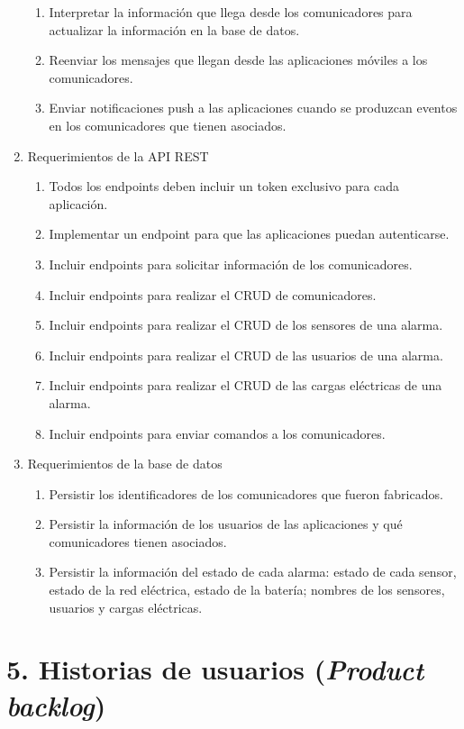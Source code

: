 \documentclass[
11pt, %
codirector, %
]{charter}
\begin{document}
\begin{enumerate}
\begin{enumerate}
			\item Interpretar la información que llega desde los comunicadores para actualizar la información en la base de datos.
			\item Reenviar los mensajes que llegan desde las aplicaciones móviles a los comunicadores.
			\item Enviar notificaciones push a las aplicaciones cuando se produzcan eventos en los comunicadores que tienen asociados.
		\end{enumerate}
	\item Requerimientos de la API REST
		\begin{enumerate}
			\item Todos los endpoints deben incluir un token exclusivo para cada aplicación.
			\item Implementar un endpoint para que las aplicaciones puedan autenticarse.
			\item Incluir endpoints para solicitar información de los comunicadores.
			\item Incluir endpoints para realizar el CRUD de comunicadores.
			\item Incluir endpoints para realizar el CRUD de los sensores de una alarma.
			\item Incluir endpoints para realizar el CRUD de las usuarios de una alarma.
			\item Incluir endpoints para realizar el CRUD de las cargas eléctricas de una alarma.
			\item Incluir endpoints para enviar comandos a los comunicadores.
		\end{enumerate}
	\item Requerimientos de la base de datos
		\begin{enumerate}
			\item Persistir los identificadores de los comunicadores que fueron fabricados.
			\item Persistir la información de los usuarios de las aplicaciones y qué comunicadores tienen asociados.
			\item Persistir la información del estado de cada alarma: estado de cada sensor, estado de la red eléctrica, estado de la batería; nombres de los sensores, usuarios y cargas eléctricas.
		\end{enumerate}

\end{enumerate}


\section{5. Historias de usuarios (\textit{Product backlog})}
\label{sec:backlog}
\end{document}
